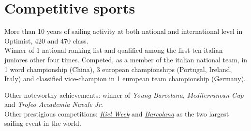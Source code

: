 \documentclass[10pt]{article} %
\begin{document}

\vspace{15pt}
\section{Competitive sports}

More than 10 years of sailing activity at both national and international level in Optimist, 420 and 470 class.\\
Winner of 1 national ranking list and qualified among the first ten italian juniores other four times.
Competed, as a member of the italian national team, in 1 word championship (China), 3 european championships
(Portugal, Ireland, Italy) and classified vice-champion in 1 european team championship (Germany).

Other noteworthy achievements: winner of \textit{Young Barcolana}, \textit{Mediterranean Cup} and \textit{Trofeo Accademia Navale Jr}.\\
Other prestigious competitions: \href{https://www.kieler-woche.de}{\textit{Kiel Week}} and \href{https://www.barcolana.it}{\textit{Barcolana}} as the two largest sailing event in the world.

	
	
	
    
    
	
\end{document}
